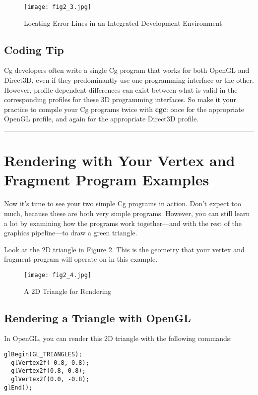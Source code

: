 \documentclass[../main.tex]{subfiles}
\begin{document}
\begin{figure}
    \centering
    \texttt{[image: fig2\_3.jpg]}
    \caption{Locating Error Lines in an Integrated Development Environment}
    \label{fig:2-3}
\end{figure}

\subsection*{Coding Tip}

Cg developers often write a single Cg program that works for both OpenGL and Direct3D, even if they predominantly use one programming interface or the other. However, profile-dependent differences can exist between what is valid in the corresponding profiles for these 3D programming interfaces. So make it your practice to compile your Cg programs twice with \textbf{cgc}: once for the appropriate OpenGL profile, and again for the appropriate Direct3D profile.
\hrule

\section{Rendering with Your Vertex and Fragment Program Examples}

Now it's time to see your two simple Cg programs in action. Don't expect too much, because these are both very simple programs. However, you can still learn a lot by examining how the programs work together—and with the rest of the graphics pipeline—to draw a green triangle.

Look at the 2D triangle in Figure \ref{fig:2-4}. This is the geometry that your vertex and fragment program will operate on in this example.

\begin{figure}
    \centering
    \texttt{[image: fig2\_4.jpg]}
    \caption{A 2D Triangle for Rendering}
    \label{fig:2-4}
\end{figure}

\subsection{Rendering a Triangle with OpenGL}

In OpenGL, you can render this 2D triangle with the following commands:

\FloatBarrier
\begin{lstlisting}
glBegin(GL_TRIANGLES);
  glVertex2f(-0.8, 0.8);
  glVertex2f(0.8, 0.8);
  glVertex2f(0.0, -0.8);
glEnd();
\end{lstlisting}
\FloatBarrier
\end{document}

